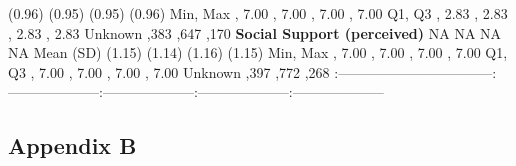 \documentclass[
  single column]{article}
\begin{document}
\begin{table}
{(0.96)  (0.95)  (0.95)  (0.96)
\textbar{} \textbar Min, Max , 7.00 , 7.00
, 7.00 , 7.00 \textbar{} \textbar Q1, Q3
, 2.83 , 2.83 , 2.83 ,
2.83 \textbar{} \textbar Unknown  ,383 ,647
,170 \textbar{} \textbar{}\textbf{Social Support (perceived)}
\textbar NA \textbar NA \textbar NA \textbar NA \textbar{} \textbar Mean
(SD)  (1.15)  (1.14)  (1.16)
 (1.15) \textbar{} \textbar Min, Max , 7.00
, 7.00 , 7.00 , 7.00 \textbar{}
\textbar Q1, Q3 , 7.00 , 7.00 , 7.00
, 7.00 \textbar{} \textbar Unknown  ,397
,772 ,268 \textbar{}
\textbar:---------------------------------\textbar:--------------------\textbar:--------------------\textbar:--------------------\textbar:--------------------\textbar{}

}

\end{table}%

\newpage{}

\subsection{Appendix B}\label{appendix-b}

\newpage{}
\end{document}
